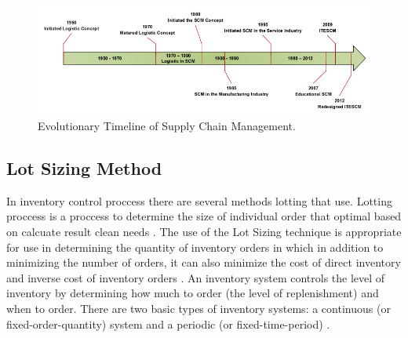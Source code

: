 \documentclass[12pt,a4paper,final]{iopart}
\begin{document}
\begin{figure}[htb!]
	\centering
	\includegraphics[width=1.0\textwidth]
		{evolution.png}
	\caption{\label{figureEvolution}Evolutionary Timeline of Supply Chain Management.}
\end{figure}

\subsection{Lot Sizing Method}

In inventory control proccess there are several methods lotting that use. Lotting proccess is a proccess to determine the size of individual order that optimal based on calcuate result clean needs \cite{Ibrahim}. The use of the Lot Sizing technique is appropriate for use in determining the quantity of inventory orders in which in addition to minimizing the number of orders, it can also minimize the cost of direct inventory and inverse cost of inventory orders \cite{Djunaidi2019}. An inventory system controls the level of inventory by determining how much to order (the level of replenishment) and when to order. There are two basic types of inventory systems: a continuous (or fixed-order-quantity) system and a periodic (or fixed-time-period) \cite{Rusell2011}. 

\end{document}
